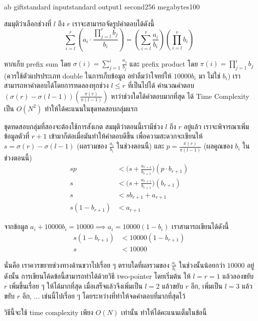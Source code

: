 \documentclass[11pt,a4paper]{article}
\begin{document}
\begin{problem}{ab gift}{standard input}{standard output}{1 second}{256 megabytes}{100}

สมมุติว่าเลือกช่วงที่ $l$ ถึง $r$ เราจะสามารถจัดรูปคำตอบได้ดังนี้
$$\sum_{i=l}^{r} \left( a_i \cdot \frac{\prod_{j=l}^{r} b_j}{b_i} \right) = \left(\sum_{i=l}^{r} \frac{a_i}{b_i}\right)\left(\prod_{i=l}^{r} b_i\right)$$

หากเก็บ prefix sum โดย $\sigma(i) = \sum_{j=1}^{i} \frac{a_j}{b_j}$ และ prefix product โดย $\pi(i) = \prod_{j=1}^{i} b_j$ (ควรใช้ตัวแปรประเภท double ในการเก็บข้อมูล อย่าลืมว่าโจทย์ให้ $10000b_i$ มา ไม่ใช่ $b_i$) เราสามารถหาคำตอบได้โดยการทดลองทุกช่วง $l \leq r$ ที่เป็นไปได้ คำนวณคำตอบ $\left( \sigma(r)-\sigma(l-1) \right) \left( \frac{\pi(r)}{\pi(l-1)} \right)$ หาว่าช่วงใดได้คำตอบมากที่สุด ได้ Time Complexity เป็น $O(N^2)$ ทำให้ได้คะแนนในชุดทดสอบกลุ่มแรก

ชุดทดสอบกลุ่มที่สองจะต้องใช้การสังเกต สมมุติว่าตอนนี้เรามีช่วง $l$ ถึง $r$ อยู่แล้ว เราจะพิจารณาเพิ่มข้อมูลตัวที่ $r+1$ เข้ามาก็ต่อเมื่อมันทำให้คำตอบดีขึ้น เพื่อความสะดวกจะเขียนให้ $s = \sigma(r)-\sigma(l-1)$ (ผลรวมของ $\frac{a_i}{b_i}$ ในช่วงตอนนี้) และ $p = \frac{\pi(r)}{\pi(l-1)}$ (ผลคูณของ $b_i$ ในช่วงตอนนี้)
\begin{align*}
sp &< \bigg(s+\frac{a_{r+1}}{b_{r+1}}\bigg)(p \cdot b_{r+1}) \\
s &< \bigg(s+\frac{a_{r+1}}{b_{r+1}}\bigg)(b_{r+1}) \\
s &< s b_{r+1} + a_{r+1} \\
s(1-b_{r+1}) &< a_{r+1}
\end{align*}

จากข้อมูล $a_i + 10000b_i = 10000 \implies a_i = 10000(1-b_i)$ เราสามารถเขียนได้ดังนี้
\begin{align*}
s(1-b_{r+1}) &< 10000(1-b_{r+1}) \\
s &< 10000
\end{align*}

นั่นคือ เราควรขยายช่วงทางด้านขวาไปเรื่อย ๆ ตราบใดที่ผลรวมของ $\frac{a_i}{b_i}$ ในช่วงนั้นน้อยกว่า $10000$ อยู่ ดังนั้น การเขียนโค้ดข้อนี้สามารถทำได้ด้วยวิธี two-pointer โดยเริ่มต้น ให้ $l=r=1$ แล้วลองขยับ $r$ เพิ่มขึ้นเรื่อย ๆ ให้ได้มากที่สุด เมื่อเสร็จแล้วจึงเพิ่มเป็น $l=2$ แล้วขยับ $r$ อีก, เพิ่มเป็น $l=3$ แล้วขยับ $r$ อีก, $\dots$ เช่นนี้ไปเรื่อย ๆ โดยระหว่างที่ทำให้จดคำตอบที่มากที่สุดไว้

วิธีนี้จะใช้ time complexity เพียง $O(N)$ เท่านั้น ทำให้ได้คะแนนเต็มในข้อนี้

\end{problem}
\end{document}
